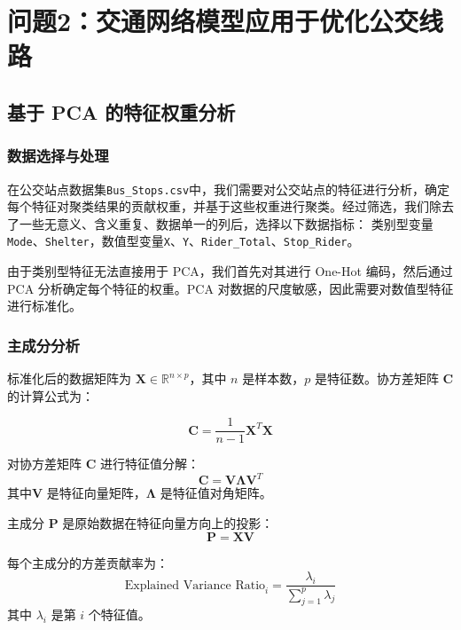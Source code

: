\documentclass[12pt, a4paper, oneside]{ctexart}
\begin{document}
\section{问题2：交通网络模型应用于优化公交线路}

\subsection{基于 PCA 的特征权重分析}

\subsubsection{数据选择与处理}

在公交站点数据集\texttt{Bus\_Stops.csv}中，我们需要对公交站点的特征进行分析，确定每个特征对聚类结果的贡献权重，并基于这些权重进行聚类。经过筛选，我们除去了一些无意义、含义重复、数据单一的列后，选择以下数据指标：
类别型变量\texttt{Mode}、\texttt{Shelter}，数值型变量\texttt{X}、\texttt{Y}、\texttt{Rider\_Total}、\texttt{Stop\_Rider}。

由于类别型特征无法直接用于 PCA，我们首先对其进行 One-Hot 编码，然后通过 PCA 分析确定每个特征的权重。PCA 对数据的尺度敏感，因此需要对数值型特征进行标准化。

\subsubsection{主成分分析}

标准化后的数据矩阵为 $\mathbf{X} \in \mathbb{R}^{n \times p}$，其中 $n$ 是样本数，$p$ 是特征数。协方差矩阵 $\mathbf{C}$ 的计算公式为：

\begin{equation}
\mathbf{C} = \frac{1}{n - 1} \mathbf{X}^T \mathbf{X}
\end{equation}

对协方差矩阵 $\mathbf{C}$ 进行特征值分解：
\begin{equation}
\mathbf{C} = \mathbf{V} \mathbf{\Lambda} \mathbf{V}^T
\end{equation}
其中$\mathbf{V}$ 是特征向量矩阵，$\mathbf{\Lambda}$ 是特征值对角矩阵。

主成分 $\mathbf{P}$ 是原始数据在特征向量方向上的投影：
\begin{equation}
\mathbf{P} = \mathbf{X} \mathbf{V}
\end{equation}

每个主成分的方差贡献率为：
\begin{equation}
\text{Explained Variance Ratio}_i = \frac{\lambda_i}{\sum_{j = 1}^p \lambda_j}
\end{equation}
其中 $\lambda_i$ 是第 $i$ 个特征值。
\end{document}

